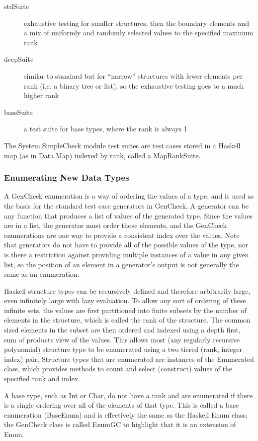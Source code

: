 \begin{description}
\item[stdSuite] exhaustive testing for smaller structures, then the boundary elements
and a mix of uniformly and randomly selected values to the specified maximum rank 
\item[deepSuite] similar to standard but for ``narrow'' structures with fewer elements per rank
(i.e. a binary tree or list), so the exhaustive testing goes to a much higher rank
\item[baseSuite] a test suite for base types, where the rank is always 1
\end{description}

The System.SimpleCheck module test suites are test cases stored in 
a Haskell map (as in Data.Map) indexed by rank, called a MapRankSuite.

\subsubsection{Enumerating New Data Types}
A GenCheck enumeration is a way of ordering the values of a type,
and is used as the basis for the standard test case generators in GenCheck.
A generator can be any function that produces a list of values of the generated type.
Since the values are in a list, the generator must order those elements,
and the GenCheck enumerations are one way to provide a consistent index over the values.
Note that generators do not have to provide all of the possible values of the type,
nor is there a restriction against providing multiple instances of a value in any given list,
so the position of an element in a generator's output is not generally the same as an enumeration.

Haskell structure types can be recursively defined and therefore arbitrarily large,
even infinitely large with lazy evaluation.  To allow any sort of ordering of these infinite sets,
the values are first partitioned into finite subsets by the number of elements in the structure, 
which is called the rank of the structure.  The common sized elements in the subset 
are then ordered and indexed using a depth first, sum of products view of the values.
This allows most (any regularly recursive polynomial) structure type to be enumerated
using a two tiered (rank, integer index) pair.  Structure types that are enumerated are 
instances of the Enumerated class, which provides methods to count and select (construct)
values of the specified rank and index.

A base type, such as Int or Char, do not have a rank and are enumerated if there is a
single ordering over all of the elements of that type.  This is called a base enumeration (BaseEnum)
and is effectively the same as the Haskell Enum class; the GenCheck class is called EnumGC 
to highlight that it is an extension of Enum.

